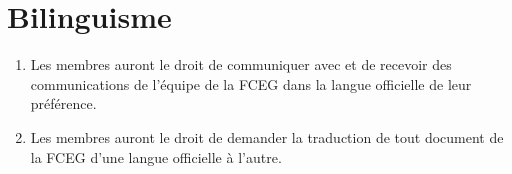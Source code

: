 \section{Bilinguisme}
\label{bilinguisme}

\begin{enumerate}
 \item Les membres auront le droit de communiquer avec et de recevoir des communications de l'équipe de la FCEG dans la langue officielle de leur préférence.
 \item Les membres auront le droit de demander la traduction de tout document de la FCEG d'une langue officielle à l'autre.
\end{enumerate}
